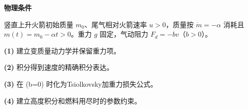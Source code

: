 \textbf{物理条件}\par 竖直上升火箭初始质量 \(m_0\)、尾气相对火箭速率 \(u>0\)，质量按 \(\dot m=-\alpha\) 消耗且 \(m(t)=m_0-\alpha t>0\)。重力 \(g\) 固定，气动阻力 \(F_d=-bv\)（\(b>0\)）。
\par\noindent\textbf{(1)} 建立变质量动力学并保留重力项。
\par\noindent\textbf{(2)} 积分得到速度的精确积分表达。
\par\noindent\textbf{(3)} 在 (b=0) 时化为Tsiolkovsky加重力损失公式。
\par\noindent\textbf{(4)} 建立高度积分和燃料用尽时的参数约束。

